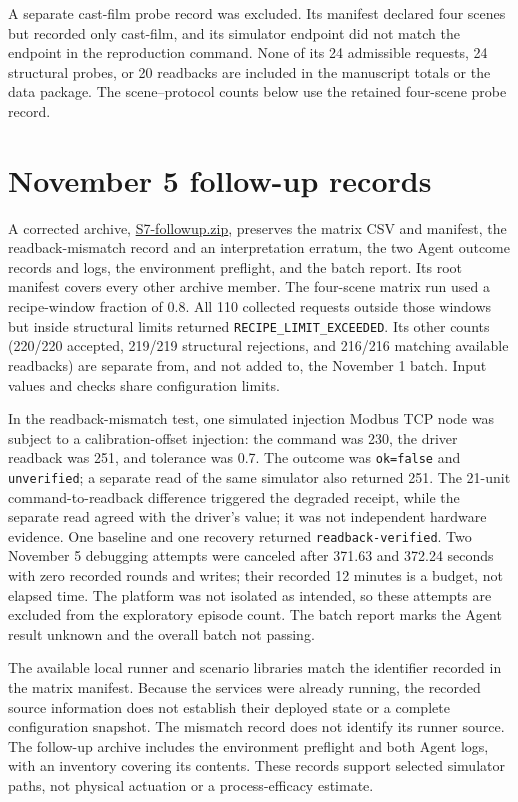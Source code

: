 \documentclass[10pt]{article}
\begin{document}
A separate cast-film probe record was excluded. Its manifest declared four scenes but recorded only cast-film, and its simulator endpoint did not match the endpoint in the reproduction command. None of its 24 admissible requests, 24 structural probes, or 20 readbacks are included in the manuscript totals or the data package. The scene--protocol counts below use the retained four-scene probe record.

\section*{November 5 follow-up records}
A corrected archive, \url{S7-followup.zip}, preserves the matrix CSV and manifest, the readback-mismatch record and an interpretation erratum, the two Agent outcome records and logs, the environment preflight, and the batch report. Its root manifest covers every other archive member. The four-scene matrix run used a recipe-window fraction of 0.8. All 110 collected requests outside those windows but inside structural limits returned \texttt{RECIPE\_LIMIT\_EXCEEDED}. Its other counts (220/220 accepted, 219/219 structural rejections, and 216/216 matching available readbacks) are separate from, and not added to, the November 1 batch. Input values and checks share configuration limits.

In the readback-mismatch test, one simulated injection Modbus TCP node was subject to a calibration-offset injection: the command was 230, the driver readback was 251, and tolerance was 0.7. The outcome was \texttt{ok=false} and \texttt{unverified}; a separate read of the same simulator also returned 251. The 21-unit command-to-readback difference triggered the degraded receipt, while the separate read agreed with the driver's value; it was not independent hardware evidence. One baseline and one recovery returned \texttt{readback-verified}. Two November 5 debugging attempts were canceled after 371.63 and 372.24 seconds with zero recorded rounds and writes; their recorded 12 minutes is a budget, not elapsed time. The platform was not isolated as intended, so these attempts are excluded from the exploratory episode count. The batch report marks the Agent result unknown and the overall batch not passing.

The available local runner and scenario libraries match the identifier recorded in the matrix manifest. Because the services were already running, the recorded source information does not establish their deployed state or a complete configuration snapshot. The mismatch record does not identify its runner source. The follow-up archive includes the environment preflight and both Agent logs, with an inventory covering its contents. These records support selected simulator paths, not physical actuation or a process-efficacy estimate.
\end{document}

